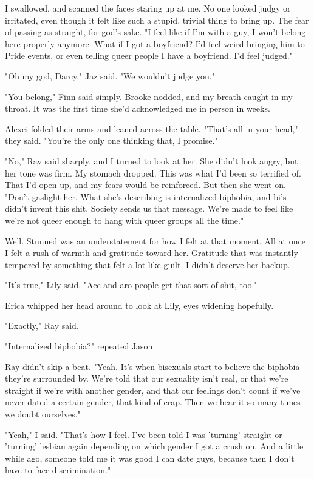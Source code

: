 \documentclass[10pt,a4paper]{article}
\begin{document}
I swallowed, and scanned the faces staring up at me. No one looked judgy or irritated, even though it felt like such a stupid, trivial thing to bring up. The fear of passing as straight, for god's sake. "I feel like if I'm with a guy, I won't belong here properly anymore. What if I got a boyfriend? I'd feel weird bringing him to Pride events, or even telling queer people I have a boyfriend. I'd feel judged."

"Oh my god, Darcy," Jaz said. "We wouldn't judge you."

"You belong," Finn said simply. Brooke nodded, and my breath caught in my throat. It was the first time she'd acknowledged me in person in weeks.

Alexei folded their arms and leaned across the table. "That's all in your head," they said. "You're the only one thinking that, I promise."

"No," Ray said sharply, and I turned to look at her. She didn't look angry, but her tone was firm. My stomach dropped. This was what I'd been so terrified of. That I'd open up, and my fears would be reinforced. But then she went on. "Don't gaslight her. What she's describing is internalized biphobia, and bi's didn't invent this shit. Society sends us that message. We're made to feel like we're not queer enough to hang with queer groups all the time."

Well. Stunned was an understatement for how I felt at that moment. All at once I felt a rush of warmth and gratitude toward her. Gratitude that was instantly tempered by something that felt a lot like guilt. I didn't deserve her backup.

"It's true," Lily said. "Ace and aro people get that sort of shit, too."

Erica whipped her head around to look at Lily, eyes widening hopefully.

"Exactly," Ray said.

"Internalized biphobia?" repeated Jason.

Ray didn't skip a beat. "Yeah. It's when bisexuals start to believe the biphobia they're surrounded by. We're told that our sexuality isn't real, or that we're straight if we're with another gender, and that our feelings don't count if we've never dated a certain gender, that kind of crap. Then we hear it so many times we doubt ourselves."

"Yeah," I said. "That's how I feel. I've been told I was 'turning' straight or 'turning' lesbian again depending on which gender I got a crush on. And a little while ago, someone told me it was good I can date guys, because then I don't have to face discrimination."
\end{document}
